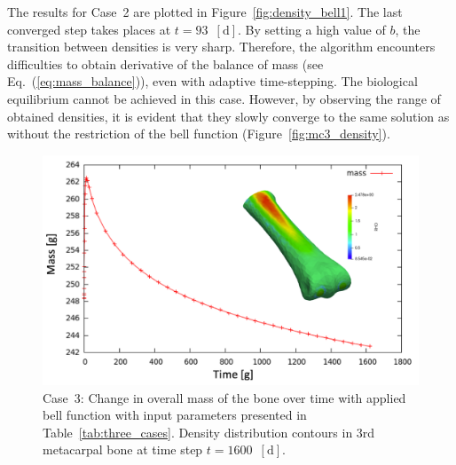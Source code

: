 \documentclass[11pt]{acmeArticle}
\numberwithin{equation}{section}
\begin{document}
The results for Case~2 are plotted in Figure~\ref{fig:density_bell1}.
The last converged step takes places at $t=93$~$[{\text{d}}]$. 
By setting a high value of $b$, the transition between densities is very sharp. 
Therefore, the algorithm encounters difficulties to obtain derivative of the balance of mass (see Eq.~(\ref{eq:mass_balance})), even with adaptive time-stepping. 
The biological equilibrium cannot be achieved in this case. 
However, by observing the range of obtained densities, it is evident that they slowly converge to the same solution as without the restriction of the bell function (Figure~\ref{fig:mc3_density}). 
\begin{figure}[h!]
	\begin{centering}
		\includegraphics[width=15cm]{Figures/graphs/density_bell2.png}
		\caption{Case~3: Change in overall mass of the bone over time with applied bell function with input parameters presented in Table~\ref{tab:three_cases}. Density distribution contours in 3rd metacarpal bone at time step $t=1600$~$[{\text{d}}]$.}
		\label{fig:density_bell2}
	\end{centering}
\end{figure}
\end{document}
